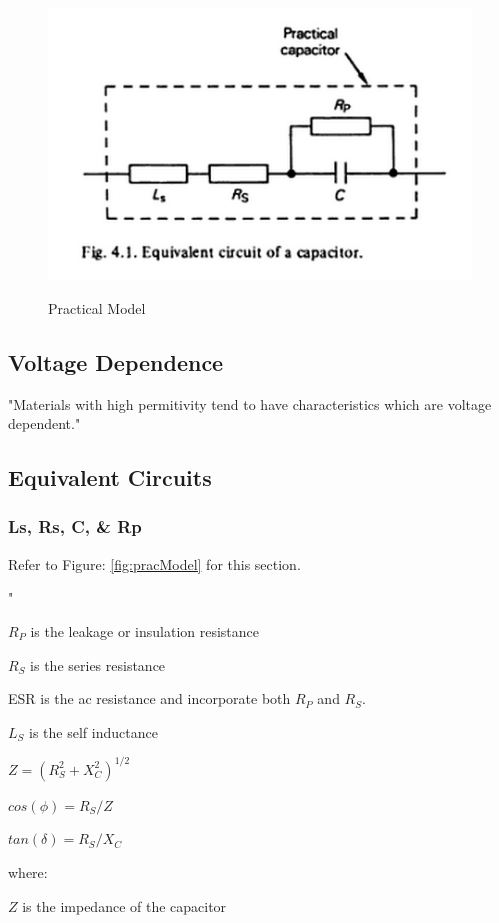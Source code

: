 \begin{figure}
    \includegraphics[keepaspectratio=true,scale=.7]{../figures/capModel_discComp.png}
    \centering
    \cite{disc_comp}
    \caption{Practical Model}
    \label{pracModel}
\end{figure}

\subsection{Voltage Dependence}

"Materials with high permitivity tend to have characteristics which are voltage dependent."\cite{disc_comp}

\subsection{Equivalent Circuits}
\subsubsection{Ls, Rs, C, \& Rp}

Refer to Figure: \ref{fig:pracModel} for this section.

"

$R_P$ is the leakage or insulation resistance

$R_S$ is the series resistance

ESR is the ac resistance and incorporate both $R_P$ and $R_S$.

$L_S$ is the self inductance 

$Z = (R_S^2 + X_C^2)^{1/2}$

$cos(\phi) = R_S / Z$

$tan(\delta) = R_S / X_C$

where:

$Z$ is the impedance of the capacitor

